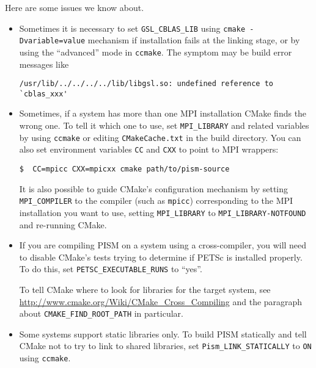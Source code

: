 \documentclass[titlepage,letterpaper,final]{scrartcl}
\begin{document}
Here are some issues we know about.
\begin{itemize}
\item Sometimes it is necessary to set \texttt{GSL_CBLAS_LIB} using
  \texttt{cmake -Dvariable=value} mechanism if installation fails at the
  linking stage, or by using the ``advanced'' mode in \texttt{ccmake}.
  The symptom may be build error messages like
\begin{verbatim}
/usr/lib/../../../../lib/libgsl.so: undefined reference to `cblas_xxx'
\end{verbatim}
\item Sometimes, if a system has more than one MPI installation CMake finds the
  wrong one. To tell it which one to use, set \texttt{MPI_LIBRARY} and related
  variables by using \texttt{ccmake} or editing \texttt{CMakeCache.txt} in the
  build directory. You can also set environment variables \texttt{CC} and
  \texttt{CXX} to point to MPI wrappers:
\begin{verbatim}
$  CC=mpicc CXX=mpicxx cmake path/to/pism-source
\end{verbatim}

  It is also possible to guide CMake's configuration mechanism by setting
  \texttt{MPI_COMPILER} to the compiler (such as \texttt{mpicc}) corresponding
  to the MPI installation you want to use, setting \texttt{MPI_LIBRARY} to
  \texttt{MPI_LIBRARY-NOTFOUND} and re-running CMake.
\item If you are compiling PISM on a system using a cross-compiler, you will
  need to disable CMake's tests trying to determine if PETSc is installed
  properly. To do this, set \texttt{PETSC_EXECUTABLE_RUNS} to ``yes''.

  To tell CMake where to look for libraries for the target system, see
  \url{http://www.cmake.org/Wiki/CMake_Cross_Compiling} and the paragraph about
  \texttt{CMAKE_FIND_ROOT_PATH} in particular.
\item Some systems support static libraries only. To build PISM statically and
  tell CMake not to try to link to shared libraries, set
  \texttt{Pism_LINK_STATICALLY} to \texttt{ON} using \texttt{ccmake}.
\end{itemize}
\end{document}
